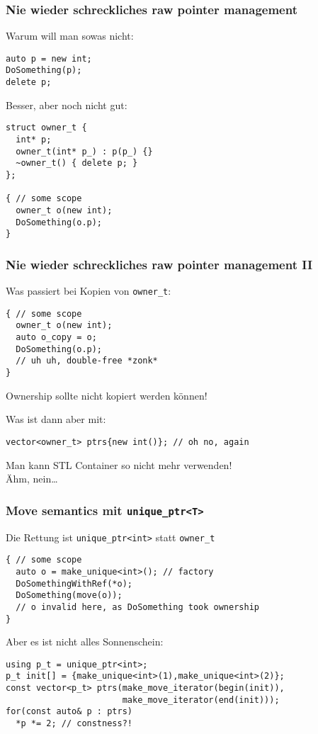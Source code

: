 \documentclass[t,ngerman,usepdftitle=false]{beamer}
\begin{document}
\begin{frame}[fragile]
  \frametitle{Nie wieder schreckliches raw pointer management}
  Warum will man sowas nicht:
  \begin{lstlisting}
auto p = new int;
DoSomething(p);
delete p;
  \end{lstlisting}
  
  \pause Besser, aber noch nicht gut:
  \begin{lstlisting}
struct owner_t {
  int* p;
  owner_t(int* p_) : p(p_) {}
  ~owner_t() { delete p; }    
};  

{ // some scope
  owner_t o(new int);
  DoSomething(o.p);
}
  \end{lstlisting}
  
\end{frame}

\begin{frame}[fragile]
  \frametitle{Nie wieder schreckliches raw pointer management II}
  Was passiert bei Kopien von \lstinline|owner_t|:
  \begin{lstlisting}
{ // some scope
  owner_t o(new int);
  auto o_copy = o;
  DoSomething(o.p);
  // uh uh, double-free *zonk*
}
\end{lstlisting}
\pause
\begin{block}{}
  \centering
  Ownership sollte nicht kopiert werden können!   
\end{block}

\pause
Was ist dann aber mit:
\begin{lstlisting}
vector<owner_t> ptrs{new int()}; // oh no, again
\end{lstlisting}

\pause
\begin{block}{}
  \centering
  Man kann STL Container so nicht mehr verwenden!\\
  {\small Ähm, nein\ldots}   
\end{block}

  
\end{frame}

\begin{frame}[fragile]
  \frametitle{Move semantics mit \lstinline|unique_ptr<T>|}
  Die Rettung ist \lstinline|unique_ptr<int>| statt \lstinline|owner_t|
\begin{lstlisting}
{ // some scope
  auto o = make_unique<int>(); // factory
  DoSomethingWithRef(*o);
  DoSomething(move(o));
  // o invalid here, as DoSomething took ownership
}
\end{lstlisting}

\pause
Aber es ist nicht alles Sonnenschein:
\begin{lstlisting}
using p_t = unique_ptr<int>;
p_t init[] = {make_unique<int>(1),make_unique<int>(2)};
const vector<p_t> ptrs(make_move_iterator(begin(init)),
                       make_move_iterator(end(init)));
for(const auto& p : ptrs)
  *p *= 2; // constness?! 
\end{lstlisting} 
  
  
\end{frame}
\end{document}
